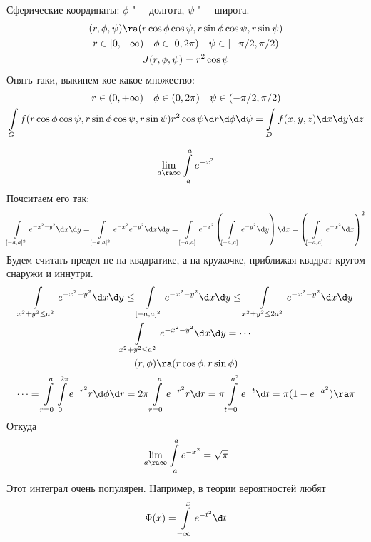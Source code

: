 \begin{exmp}
	Сферические координаты: $\phi$ "--- долгота, $\psi$ "--- широта.
	\begin{gather*}
		(r, \phi, \psi) \ra (r \cos \phi \cos \psi, r \sin \phi \cos \psi, r \sin \psi) \\
		r \in [0, +\infty) \quad \phi \in [0, 2\pi) \quad \psi \in [-\pi/2, \pi/2) \\
		J(r, \phi, \psi) = r^2 \cos \psi
	\end{gather*}
	Опять-таки, выкинем кое-какое множество:
	\begin{gather*}
		r \in (0, +\infty) \quad \phi \in (0, 2\pi) \quad \psi \in (-\pi/2, \pi/2) \\
		\int\limits_G f(r \cos \phi \cos \psi, r \sin \phi \cos \psi, r \sin \psi) r^2 \cos \psi \d r \d \phi \d \psi
		= \int\limits_D f(x, y, z) \d x \d y \d z
	\end{gather*}
\end{exmp}

\begin{exmp}
	\[
		\lim_{a \ra \infty} \int\limits_{-a}^{a} e^{-x^2}
	\]
	Почситаем его так:
	\begin{gather*}
		\int\limits_{[-a,a]^2} e^{-x^2-y^2} \d x \d y = \int\limits_{[-a,a]^2} e^{-x^2} e^{-y^2} \d x \d y
		= \int\limits_{[-a,a]} e^{-x^2} \left(\int\limits_{[-a,a]} e^{-y^2} \d y \right)\d x
		= \left(\int\limits_{[-a,a]} e^{-x^2} \d x\right)^2
	\end{gather*}
	Будем считать предел не на квадратике, а на кружочке, приближая квадрат кругом снаружи и иннутри.
	\begin{gather*}
		\int\limits_{x^2+y^2\le a^2} e^{-x^2-y^2} \d x \d y
		\le \int\limits_{[-a,a]^2} e^{-x^2-y^2} \d x \d y
		\le \int\limits_{x^2+y^2\le2a^2} e^{-x^2-y^2} \d x \d y \\
		\int\limits_{x^2+y^2 \le a^2} e^{-x^2-y^2} \d x \d y = \cdots \\
		(r, \phi) \ra (r \cos \phi, r \sin \phi) \\
		\cdots = \int\limits_{r=0}^a \int\limits_{0}^{2\pi} e^{-r^2} r \d \phi \d r
		= 2 \pi \int\limits_{r=0}^a e^{-r^2} r \d r = \pi \int\limits_{t=0}^{a^2} e^{-t} \d t = \pi (1-e^{-a^2}) \ra \pi
	\end{gather*}
	Откуда
	\[
		\lim_{a \ra \infty} \int\limits_{-a}^{a} e^{-x^2} = \sqrt \pi
	\]
	Этот интеграл очень популярен.
	Например, в теории вероятностей любят
	\[ \Phi(x) = \int\limits_{-\infty}^x e^{-t^2} \d t \]
\end{exmp}

